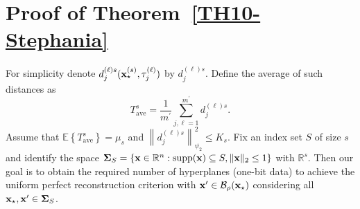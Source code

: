 \documentclass[12pt,draftcls,onecolumn]{IEEEtran}
\begin{document}
\section{Proof of Theorem~\ref{TH10-Stephania}}
\label{arian}
For simplicity denote $d_j^{(\ell)s}(\mathbf{x}_{\star}^{(s)},\tau_j^{(\ell)})$ by $d_j^{(\ell)s}$. Define the average of such distances as
\begin{equation}
\label{kvm_18}
T_{\mathrm{ave}}^{s}=\frac{1}{m^{\prime}}\sum_{j,\ell=1}^{m^{\prime}}d_j^{(\ell)s}.
\end{equation}
Assume that $\mathbb{E}\left\{T_{\mathrm{ave}}^{s}\right\}=\mu_s$ and $\left\|d_j^{(\ell)s}\right\|_{\psi_2}^2\leq K_s$. 
Fix an index set $S$ of size $s$ and identify the space $\boldsymbol{\Sigma}_{S}=\left\{\mathbf{x}\in\mathbb{R}^n:\operatorname{supp}(\mathbf{x})\subseteq S,\|\mathbf{x}\|_2\leq 1\right\}$ with $\mathbb{R}^s$. 
Then our goal is to obtain the required number of hyperplanes (one-bit data) to achieve the uniform perfect reconstruction criterion with $\mathbf{x}^{\prime}\in\mathcal{B}_{\rho}(\mathbf{x}_{\star})$ considering all $\mathbf{x}_{\star},\mathbf{x}^{\prime}\in\boldsymbol{\Sigma}_{S}$.

\end{document}
